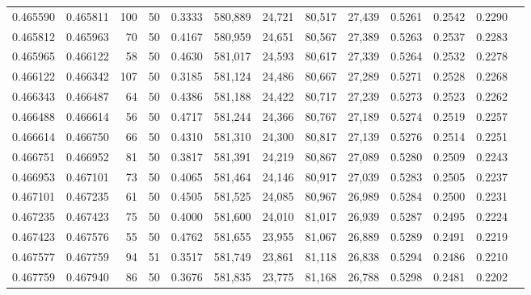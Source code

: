 \begin{tabular}{rrrrrrrrrrrrr}
0.465590 & 0.465811 &   100 &  50 &                                     0.3333 & 580,889 &  24,721 &  80,517 &  27,439 & 0.5261 & 0.2542 & 0.2290 \\
0.465812 & 0.465963 &    70 &  50 &                                     0.4167 & 580,959 &  24,651 &  80,567 &  27,389 & 0.5263 & 0.2537 & 0.2283 \\
0.465965 & 0.466122 &    58 &  50 &                                     0.4630 & 581,017 &  24,593 &  80,617 &  27,339 & 0.5264 & 0.2532 & 0.2278 \\
0.466122 & 0.466342 &   107 &  50 &                                     0.3185 & 581,124 &  24,486 &  80,667 &  27,289 & 0.5271 & 0.2528 & 0.2268 \\
0.466343 & 0.466487 &    64 &  50 &                                     0.4386 & 581,188 &  24,422 &  80,717 &  27,239 & 0.5273 & 0.2523 & 0.2262 \\
0.466488 & 0.466614 &    56 &  50 &                                     0.4717 & 581,244 &  24,366 &  80,767 &  27,189 & 0.5274 & 0.2519 & 0.2257 \\
0.466614 & 0.466750 &    66 &  50 &                                     0.4310 & 581,310 &  24,300 &  80,817 &  27,139 & 0.5276 & 0.2514 & 0.2251 \\
0.466751 & 0.466952 &    81 &  50 &                                     0.3817 & 581,391 &  24,219 &  80,867 &  27,089 & 0.5280 & 0.2509 & 0.2243 \\
0.466953 & 0.467101 &    73 &  50 &                                     0.4065 & 581,464 &  24,146 &  80,917 &  27,039 & 0.5283 & 0.2505 & 0.2237 \\
0.467101 & 0.467235 &    61 &  50 &                                     0.4505 & 581,525 &  24,085 &  80,967 &  26,989 & 0.5284 & 0.2500 & 0.2231 \\
0.467235 & 0.467423 &    75 &  50 &                                     0.4000 & 581,600 &  24,010 &  81,017 &  26,939 & 0.5287 & 0.2495 & 0.2224 \\
0.467423 & 0.467576 &    55 &  50 &                                     0.4762 & 581,655 &  23,955 &  81,067 &  26,889 & 0.5289 & 0.2491 & 0.2219 \\
0.467577 & 0.467759 &    94 &  51 &                                     0.3517 & 581,749 &  23,861 &  81,118 &  26,838 & 0.5294 & 0.2486 & 0.2210 \\
0.467759 & 0.467940 &    86 &  50 &                                     0.3676 & 581,835 &  23,775 &  81,168 &  26,788 & 0.5298 & 0.2481 & 0.2202 \\

\end{tabular}
